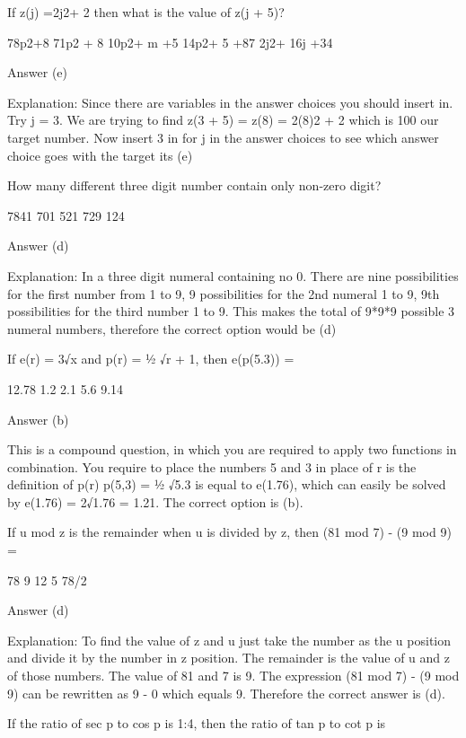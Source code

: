 

    If z(j) =2j2+ 2 then what is the value of z(j + 5)?

        78p2+8
        71p2 + 8
        10p2+ m +5
        14p2+ 5 +87
        2j2+ 16j +34 

    Answer (e)

    Explanation: Since there are variables in the answer choices you should insert in. Try j = 3. We are trying to find z(3 + 5) = z(8) = 2(8)2 + 2 which is 100 our target number. Now insert 3 in for j in the answer choices to see which answer choice goes with the target its (e)

    How many different three digit number contain only non-zero digit?

        7841
        701
        521
        729
        124 

    Answer (d)

    Explanation: In a three digit numeral containing no 0. There are nine possibilities for the first number from 1 to 9, 9 possibilities for the 2nd numeral 1 to 9, 9th possibilities for the third number 1 to 9. This makes the total of 9*9*9 possible 3 numeral numbers, therefore the correct option would be (d)

    If e(r) = 3√x and p(r) = ½ √r + 1, then e(p(5.3)) =

        12.78
        1.2
        2.1
        5.6
        9.14 

    Answer (b)

    This is a compound question, in which you are required to apply two functions in combination. You require to place the numbers 5 and 3 in place of r is the definition of p(r) p(5,3) = ½ √5.3 is equal to e(1.76), which can easily be solved by e(1.76) = 2√1.76 = 1.21. The correct option is (b).

    If u mod z is the remainder when u is divided by z, then (81 mod 7) - (9 mod 9) =

        78
        9
        12
        5
        78/2 

    Answer (d)

    Explanation: To find the value of z and u just take the number as the u position and divide it by the number in z position. The remainder is the value of u and z of those numbers. The value of 81 and 7 is 9. The expression (81 mod 7) - (9 mod 9) can be rewritten as 9 - 0 which equals 9. Therefore the correct answer is (d).

    If the ratio of sec p to cos p is 1:4, then the ratio of tan p to cot p is

